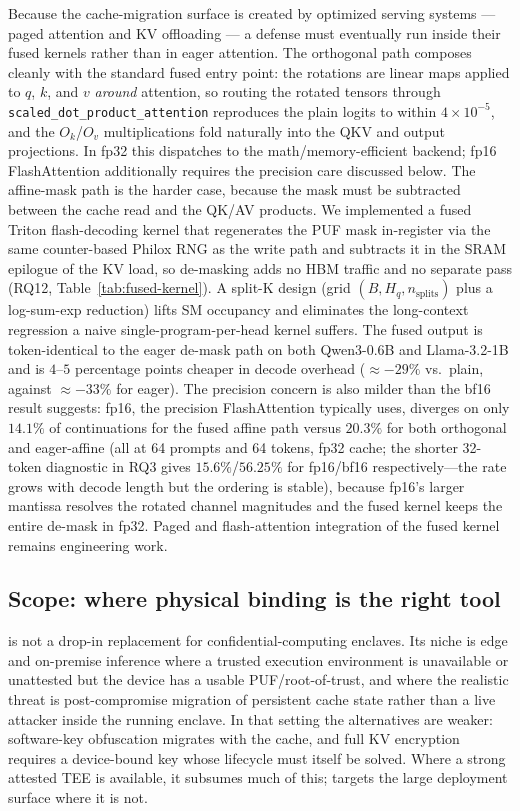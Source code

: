 Because the cache-migration surface is created by optimized serving systems --- paged attention and KV offloading --- a defense must eventually run inside their fused kernels rather than in eager attention. The orthogonal path composes cleanly with the standard fused entry point: the rotations are linear maps applied to $q$, $k$, and $v$ \emph{around} attention, so routing the rotated tensors through \texttt{scaled\_dot\_product\_attention} reproduces the plain logits to within $4\times10^{-5}$, and the $O_k$/$O_v$ multiplications fold naturally into the QKV and output projections. In fp32 this dispatches to the math/memory-efficient backend; fp16 FlashAttention additionally requires the precision care discussed below. The affine-mask path is the harder case, because the mask must be subtracted between the cache read and the QK/AV products. We implemented a fused Triton flash-decoding kernel that regenerates the PUF mask in-register via the same counter-based Philox RNG as the write path and subtracts it in the SRAM epilogue of the KV load, so de-masking adds no HBM traffic and no separate pass (RQ12, Table~\ref{tab:fused-kernel}). A split-K design (grid $(B,H_q,n_{\text{splits}})$ plus a log-sum-exp reduction) lifts SM occupancy and eliminates the long-context regression a naive single-program-per-head kernel suffers. The fused output is token-identical to the eager de-mask path on both Qwen3-0.6B and Llama-3.2-1B and is $4$--$5$ percentage points cheaper in decode overhead ($\approx{-}29\%$ vs.\ plain, against $\approx{-}33\%$ for eager). The precision concern is also milder than the bf16 result suggests: fp16, the precision FlashAttention typically uses, diverges on only $14.1\%$ of continuations for the fused affine path versus $20.3\%$ for both orthogonal and eager-affine (all at 64 prompts and 64 tokens, fp32 cache; the shorter 32-token diagnostic in RQ3 gives $15.6\%$/$56.25\%$ for fp16/bf16 respectively---the rate grows with decode length but the ordering is stable), because fp16's larger mantissa resolves the rotated channel magnitudes and the fused kernel keeps the entire de-mask in fp32. Paged and flash-attention integration of the fused kernel remains engineering work.

\subsection{Scope: where physical binding is the right tool}

\sys{} is not a drop-in replacement for confidential-computing enclaves. Its niche is edge and on-premise inference where a trusted execution environment is unavailable or unattested but the device has a usable PUF/root-of-trust, and where the realistic threat is post-compromise migration of persistent cache state rather than a live attacker inside the running enclave. In that setting the alternatives are weaker: software-key obfuscation migrates with the cache, and full KV encryption requires a device-bound key whose lifecycle must itself be solved. Where a strong attested TEE is available, it subsumes much of this; \sys{} targets the large deployment surface where it is not.

